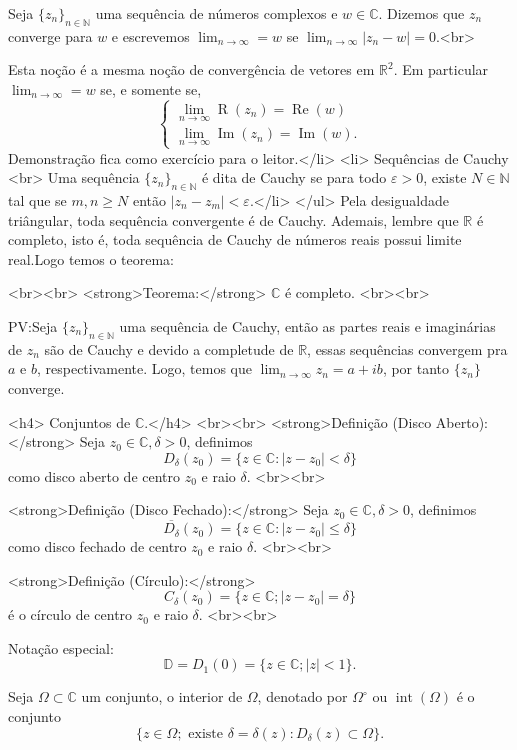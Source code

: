 Seja $\{z_n\}_{n\in \mathbb{N}}$ uma sequência de números complexos e $w \in \mathbb{C}$.
Dizemos que $z_n$ converge para $w$ e escrevemos
$\lim_{n \rightarrow \infty} = w$ se $\lim_{n \rightarrow \infty}|z_n-w| = 0.$<br>

Esta noção é a mesma noção de convergência de vetores em $\mathbb{R}^2$. Em particular $\lim_{n \rightarrow \infty} = w$ se, e somente se,
$$
\begin{cases}
  \lim_{n \rightarrow \infty}\operatorname{R}(z_n) = \operatorname{Re}(w)\\
  \lim_{n \rightarrow \infty}\operatorname{Im}(z_n) = \operatorname{Im}(w).
\end{cases}
$$
Demonstração fica como exercício para o leitor.</li>
<li> Sequências de Cauchy <br>
Uma sequência $\{z_n\}_{n \in \mathbb{N}}$ é dita de Cauchy se para todo $\varepsilon>0$,
existe $N \in \mathbb{N}$ tal que se $m,n \geqslant N$ então $|z_n-z_m|< \varepsilon.$</li>
</ul>
Pela desigualdade triângular, toda sequência convergente é de Cauchy. Ademais, lembre que $\mathbb{R}$ é completo, isto é, toda sequência de Cauchy de números reais possui limite real.Logo temos o teorema:

<br><br>
<strong>Teorema:</strong> $\mathbb{C}$ é completo.
<br><br>

PV:Seja $\{z_n\}_{n \in \mathbb{N}}$ uma sequência de Cauchy, então as partes reais e imaginárias de $z_n$ são de Cauchy e devido a completude de $\mathbb{R}$, essas sequências convergem pra $a$ e $b$, respectivamente. Logo, temos que $\lim_{n \rightarrow \infty}z_n = a+ib$, por tanto $\{z_n\}$ converge.

<h4> Conjuntos de $\mathbb{C}$.</h4>
<br><br>
<strong>Definição (Disco Aberto):</strong>
Seja $z_0 \in \mathbb{C},\delta >0$, definimos $$D_{\delta}(z_0) = \{z\in \mathbb{C}:|z-z_0|<\delta \}$$ como disco aberto de centro $z_0$ e raio $\delta.$
<br><br>

<strong>Definição (Disco Fechado):</strong>
Seja $z_0 \in \mathbb{C},\delta >0$, definimos $$\overline{D_{\delta}}(z_0) = \{z\in \mathbb{C}:|z-z_0|\leqslant \delta \}$$ como disco fechado de centro $z_0$ e raio $\delta.$
<br><br>

<strong>Definição (Círculo):</strong> $$C_{\delta}(z_0) = \{z \in \mathbb{C}; |z-z_0|= \delta\}$$ é o círculo de centro $z_0$ e raio $\delta$.
<br><br>

Notação especial: $$\mathbb{D} = D_1(0) = \{ z \in \mathbb{C} ; |z|<1\}.$$

Seja $\Omega \subset \mathbb{C}$ um conjunto, o interior de $\Omega$, denotado por
$\Omega^\circ$ ou $\operatorname{int}(\Omega)$
 é o conjunto
 $$\{z \in \Omega; \text{ existe } \delta = \delta(z) : D_{\delta}(z) \subset \Omega \}.$$


